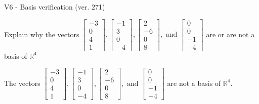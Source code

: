 \begin{exercise}
  \begin{exerciseTitle}V6 - Basis verification (ver. 271)\end{exerciseTitle}
  \begin{exerciseStatement}
    Explain why the vectors \(\left[\begin{array}{r}
-3 \\
0 \\
4 \\
1
\end{array}\right] , \left[\begin{array}{r}
-1 \\
3 \\
0 \\
-4
\end{array}\right] , \left[\begin{array}{r}
2 \\
-6 \\
0 \\
8
\end{array}\right] , \text{ and } \left[\begin{array}{r}
0 \\
0 \\
-1 \\
-4
\end{array}\right]\) are or are not a basis of \(\mathbb{R}^4\)	


  \end{exerciseStatement}
  \begin{exerciseAnswer}
   The vectors \(\left[\begin{array}{r}
-3 \\
0 \\
4 \\
1
\end{array}\right] , \left[\begin{array}{r}
-1 \\
3 \\
0 \\
-4
\end{array}\right] , \left[\begin{array}{r}
2 \\
-6 \\
0 \\
8
\end{array}\right] , \text{ and } \left[\begin{array}{r}
0 \\
0 \\
-1 \\
-4
\end{array}\right]\) 
  	 are not  a basis of \(\mathbb{R}^4\).
  


  \end{exerciseAnswer}
\end{exercise}